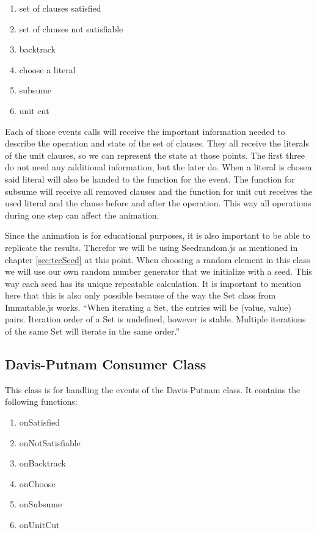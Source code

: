 \begin{enumerate}
    \item set of clauses satisfied
    \item set of clauses not satisfiable
    \item backtrack
    \item choose a literal
    \item subsume
    \item unit cut
\end{enumerate}

Each of those events calls will receive the important information needed to describe the operation and state of the set of clauses. They all receive the literals of the unit clauses, so we can represent the state at those points. The first three do not need any additional information, but the later do. When a literal is chosen said literal will also be handed to the function for the event. The function for subsume will receive all removed clauses and the function for unit cut receives the used literal and the clause before and after the operation. This way all operations during one step can affect the animation.

Since the animation is for educational purposes, it is also important to be able to replicate the results. Therefor we will be using Seedrandom.js as mentioned in chapter \ref{sec:tecSeed} at this point. When choosing a random element in this class we will use our own random number generator that we initialize with a seed. This way each seed has its unique repeatable calculation. It is important to mention here that this is also only possible because of the way the Set class from Immutable.js works. ``When iterating a Set, the entries will be (value, value) pairs. Iteration order of a Set is undefined, however is stable. Multiple iterations of the same Set will iterate in the same order.'' %

\subsection{Davis-Putnam Consumer Class}
\label{sub:impDavisPutnamConsumer}
This class is for handling the events of the Davis-Putnam class. It contains the following functions:

\begin{enumerate}
    \item onSatisfied
    \item onNotSatisfiable
    \item onBacktrack
    \item onChoose
    \item onSubsume
    \item onUnitCut
\end{enumerate}

